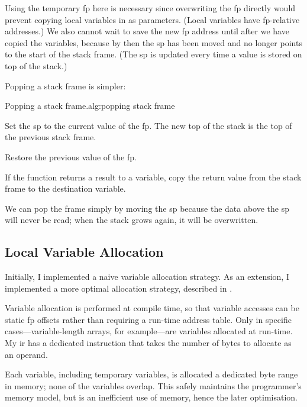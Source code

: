 \documentclass[00-main.tex]{subfiles}
\begin{document}
Using the temporary \gls{fp} here is necessary since overwriting the \gls{fp} directly would prevent copying local variables in as parameters.
(Local variables have \gls{fp}-relative addresses.)
We also cannot wait to save the new \gls{fp} address until after we have copied the variables, because by then the \gls{sp} has been moved and no longer points to the start of the stack frame.
(The \gls{sp} is updated every time a value is stored on top of the stack.)

Popping a stack frame is simpler:

\begin{Algorithm}{Popping a stack frame.}{alg:popping stack frame}
\begin{EnumerateAlgorithm}
\item
Set the \gls{sp} to the current value of the \gls{fp}.
The new top of the stack is the top of the previous stack frame.
\item
Restore the previous value of the \gls{fp}.
\item
If the function returns a result to a variable, copy the return value from the stack frame to the destination variable.
\end{EnumerateAlgorithm}
\end{Algorithm}

We can pop the frame simply by moving the \gls{sp} because the data above the \gls{sp} will never be read; when the stack grows again, it will be overwritten.

\subsection{Local Variable Allocation}\label{sec:impl:local variable allocation}

Initially, I implemented a naive variable allocation strategy.
As an extension, I implemented a more optimal allocation strategy, described in .

Variable allocation is performed at compile time, so that variable accesses can be static \gls{fp} offsets rather than requiring a run-time address table.
Only in specific cases---variable-length arrays, for example---are variables allocated at run-time.
My \gls{ir} has a dedicated  instruction that takes the number of bytes to allocate as an operand.

Each variable, including temporary variables, is allocated a dedicated byte range in memory; none of the variables overlap.
This safely maintains the programmer's memory model, but is an inefficient use of memory, hence the later optimisation.
\end{document}
